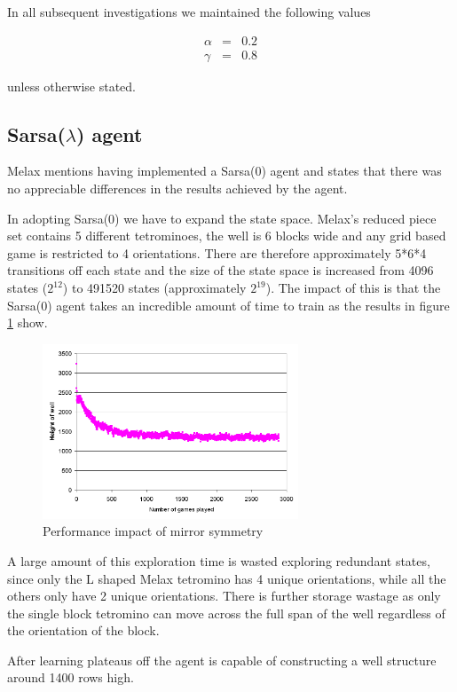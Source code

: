 \documentclass{rucsthesis}
\begin{document}
In all subsequent investigations we maintained the following values

\begin{eqnarray*}
\alpha & = & 0.2 \\
\gamma & = & 0.8
\end{eqnarray*}

unless otherwise stated.

\subsection{Sarsa($\lambda$) agent}

Melax mentions having implemented a Sarsa(0) agent and states that there was no appreciable differences in the results achieved by the agent. 

In adopting Sarsa(0) we have to expand the state space. Melax's reduced piece set contains 5 different tetrominoes, the well is 6 blocks wide and any grid based game is restricted to 4 orientations. There are therefore approximately 5*6*4 transitions off each state and the size of the state space is increased from 4096 states ($2^{12}$) to 491520 states (approximately $2^{19}$). The impact of this is that the Sarsa(0) agent takes an incredible amount of time to train as the results in figure \ref{fig:melaxsarsa} show.

\begin{figure}[h]
\centering
\includegraphics[width=3in]{sarsamelax.png}
\caption{Performance impact of mirror symmetry}
\label{fig:melaxsarsa}
\end{figure} 

A large amount of this exploration time is wasted exploring redundant states, since only the L shaped Melax tetromino has 4 unique orientations, while all the others only have 2 unique orientations. There is further storage wastage as only the single block tetromino can move across the full span of the well regardless of the orientation of the block. 

After learning plateaus off the agent is capable of constructing a well structure around 1400 rows high. 
\end{document}
